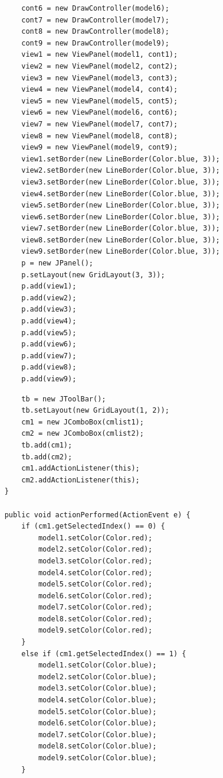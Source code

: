 \documentclass[12pt, a4paper, titlepage]{jsarticle}
\begin{document}
\begin{screen}
\begin{verbatim}
		cont6 = new DrawController(model6);
		cont7 = new DrawController(model7);
		cont8 = new DrawController(model8);
		cont9 = new DrawController(model9);
		view1 = new ViewPanel(model1, cont1);
		view2 = new ViewPanel(model2, cont2);
		view3 = new ViewPanel(model3, cont3);
		view4 = new ViewPanel(model4, cont4);
		view5 = new ViewPanel(model5, cont5);
		view6 = new ViewPanel(model6, cont6);
		view7 = new ViewPanel(model7, cont7);
		view8 = new ViewPanel(model8, cont8);
		view9 = new ViewPanel(model9, cont9);
		view1.setBorder(new LineBorder(Color.blue, 3));
		view2.setBorder(new LineBorder(Color.blue, 3));
		view3.setBorder(new LineBorder(Color.blue, 3));
		view4.setBorder(new LineBorder(Color.blue, 3));
		view5.setBorder(new LineBorder(Color.blue, 3));
		view6.setBorder(new LineBorder(Color.blue, 3));
		view7.setBorder(new LineBorder(Color.blue, 3));
		view8.setBorder(new LineBorder(Color.blue, 3));
		view9.setBorder(new LineBorder(Color.blue, 3));
		p = new JPanel();
		p.setLayout(new GridLayout(3, 3));
		p.add(view1);
		p.add(view2);
		p.add(view3);
		p.add(view4);
		p.add(view5);
		p.add(view6);
		p.add(view7);
		p.add(view8);
		p.add(view9);
\end{verbatim}
\end{screen}
\begin{screen}
\begin{verbatim}
		tb = new JToolBar();
		tb.setLayout(new GridLayout(1, 2));
		cm1 = new JComboBox(cmlist1);
		cm2 = new JComboBox(cmlist2);
		tb.add(cm1);
		tb.add(cm2);
		cm1.addActionListener(this);
		cm2.addActionListener(this);
	}

	public void actionPerformed(ActionEvent e) {
		if (cm1.getSelectedIndex() == 0) {
			model1.setColor(Color.red);
			model2.setColor(Color.red);
			model3.setColor(Color.red);
			model4.setColor(Color.red);
			model5.setColor(Color.red);
			model6.setColor(Color.red);
			model7.setColor(Color.red);
			model8.setColor(Color.red);
			model9.setColor(Color.red);
		} 
		else if (cm1.getSelectedIndex() == 1) {
			model1.setColor(Color.blue);
			model2.setColor(Color.blue);
			model3.setColor(Color.blue);
			model4.setColor(Color.blue);
			model5.setColor(Color.blue);
			model6.setColor(Color.blue);
			model7.setColor(Color.blue);
			model8.setColor(Color.blue);
			model9.setColor(Color.blue);
		} 
\end{verbatim}
\end{screen}
\end{document}
